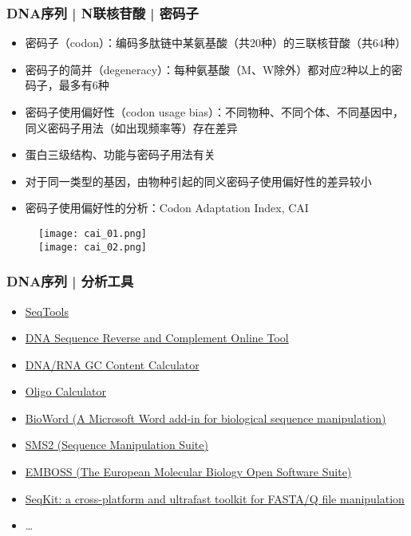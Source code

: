 \begin{frame}
  \frametitle{DNA序列 | N联核苷酸 | 密码子}
  \begin{itemize}
    \item 密码子（codon）：编码多肽链中某氨基酸（共20种）的三联核苷酸（共64种）
    \item 密码子的简并（degeneracy）：每种氨基酸（M、W除外）都对应2种以上的密码子，最多有6种
    \item 密码子使用偏好性（codon usage bias）：不同物种、不同个体、不同基因中，同义密码子用法（如出现频率等）存在差异
    \item 蛋白三级结构、功能与密码子用法有关
    \item 对于同一类型的基因，由物种引起的同义密码子使用偏好性的差异较小
    \item 密码子使用偏好性的分析：Codon Adaptation Index, CAI
  \end{itemize}
  \begin{figure}
    \centering
    \texttt{[image: cai\_01.png]}
    \\
    \texttt{[image: cai\_02.png]}
  \end{figure}
\end{frame}

\begin{frame}
  \frametitle{DNA序列 | 分析工具}
  \begin{itemize}
    \item \href{http://lh3lh3.users.sourceforge.net/fasta.shtml}{SeqTools}
    \item \href{http://www.cellbiol.com/scripts/complement/dna\_sequence\_reverse\_complement.php}{DNA Sequence Reverse and Complement Online Tool}
    \item \href{http://www.endmemo.com/bio/gc.php}{DNA/RNA GC Content Calculator}
    \item \href{http://www.sciencelauncher.com/oligocalc.html}{Oligo Calculator}
    \item \href{http://erilllab.umbc.edu/bioword-2/}{BioWord (A Microsoft Word add-in for biological sequence manipulation)}
    \item \href{http://www.bioinformatics.org/sms2/}{SMS2 (Sequence Manipulation Suite)}
    \item \href{http://emboss.sourceforge.net/}{EMBOSS (The European Molecular Biology Open Software Suite)}
    \item \href{https://github.com/shenwei356/seqkit}{SeqKit: a cross-platform and ultrafast toolkit for FASTA/Q file manipulation}
    \item \ldots
  \end{itemize}
\end{frame}

